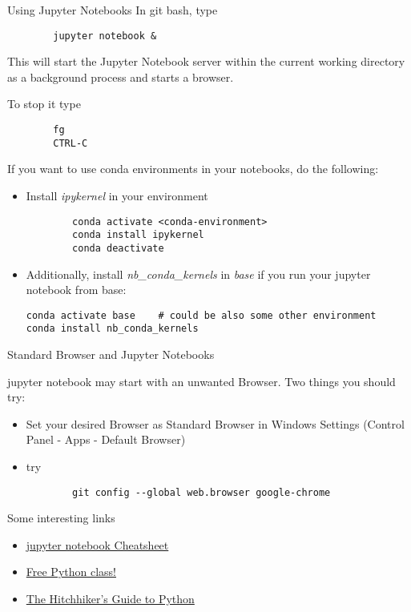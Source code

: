 \begin{frame}[fragile]{Using Jupyter Notebooks}
		In git bash, type
		\begin{verbatim}
		jupyter notebook &
		\end{verbatim}
		This will start the Jupyter Notebook server within the current working directory as a background process and starts a browser.

		To stop it type
		\begin{verbatim}
		fg
		CTRL-C
		\end{verbatim}

		If you want to use conda environments in your notebooks, do the following:
		\begin{itemize}
			\item Install \textit{ipykernel} in your environment

		\begin{verbatim}
		conda activate <conda-environment>
		conda install ipykernel
		conda deactivate
		\end{verbatim}
		\item Additionally, install \textit{nb\_conda\_kernels} in \textit{base} if you run your jupyter notebook from base:
		\begin{verbatim}
conda activate base    # could be also some other environment
conda install nb_conda_kernels
		 \end{verbatim}
		\end{itemize}
\end{frame}

\begin{frame}[fragile]{Standard Browser and Jupyter Notebooks}

	jupyter notebook may start with an unwanted Browser. Two things you should try:
	\begin{itemize}
		\item Set your desired Browser as Standard Browser in Windows Settings (Control Panel - Apps - Default Browser)
		\item try
			\begin{verbatim}
		git config --global web.browser google-chrome	\end{verbatim}

	\end{itemize}

\end{frame}

\begin{frame}{Some interesting links}
	\begin{itemize}
		\item \href{https://www.edureka.co/blog/wp-content/uploads/2018/10/Jupyter_Notebook_CheatSheet_Edureka.pdf}{jupyter notebook Cheatsheet}

		\item \href{https://www.preisjaeger.at/deals/gratis-it-workshops-e-books-von-packtpubcom-227041}{Free Python class!}

		\item \href{https://docs.python-guide.org/}{The Hitchhiker's Guide to Python}

	\end{itemize}


\end{frame}

